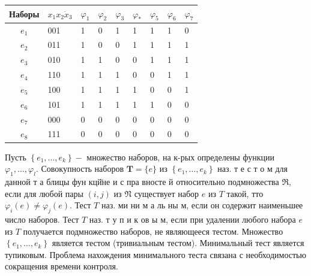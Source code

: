 \documentclass[10pt]{article}
\begin{document}
\begin{center}

\begin{tabular}{c|l|l|l|l|l|l|l|l}

\hline

Наборы & $x_{1} x_{2} \dot{x}_{3}$ & $\varphi_{1}$ & $\varphi_{2}$ & $\varphi_{3}$ & $\varphi_{*}$ & $\varphi_{5}$ & $\varphi_{6}$ & $\varphi_{7}$ \\

\hline

$e_{1}$ & 001 & 1 & 0 & 1 & 1 & 1 & 1 & 0 \\

$e_{2}$ & 011 & 1 & 0 & 0 & 1 & 1 & 1 & 1 \\

$e_{3}$ & 010 & 1 & 1 & 0 & 0 & 1 & 1 & 1 \\

$e_{4}$ & 110 & 1 & 1 & 1 & 0 & 0 & 1 & 1 \\

$e_{5}$ & 100 & 1 & 1 & 1 & 1 & 0 & 0 & 1 \\

$e_{6}$ & 101 & 1 & 1 & 1 & 1 & 1 & 0 & 0 \\

$e_{7}$ & 000 & 0 & 0 & 0 & 0 & 0 & 0 & 0 \\

$e_{8}$ & 111 & 0 & 0 & 0 & 0 & 0 & 0 & 0 \\

\hline

\end{tabular}

\end{center}



Пусть $\left\{e_{1}, \ldots, e_{k}\right\}-$ множество наборов, на к-рых определены функции $\varphi_{1}, \ldots, \varphi_{l}$. Совокупность наборов $\boldsymbol{T}=\{e\}$ из $\left\{e_{1}, \ldots, e_{k}\right\}$ наз. т е с т о м для данной т а блицы фун кцй̈не и с пра вносте й относительно подмножества $\mathfrak{R}$, если для любой пары $(i, j)$ из $\mathfrak{N}$ существует набор $e$ из $T$ такой, тто $\varphi_{i}(e) \neq \varphi_{j}(e)$. Тест $T$ наз. ми ни м а ль ны м, если он содержит наименьшее число наборов. Тест $T$ наз. т у п и к ов ы м, если при удалении любого набора $e$ из $T$ получается подмножество наборов, не являющееся тестом. Множество $\left\{e_{1}, \ldots, e_{k}\right\}$ является тестом (тривиальным тестом). Минимальный тест является тупиковым. Проблема нахождения минимального теста связана с необходимостью сокращения времени контроля.
\end{document}
